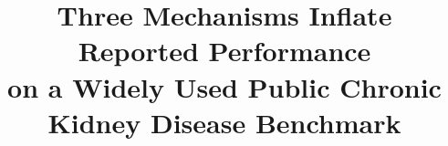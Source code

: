 \documentclass[conference]{IEEEtran}
\begin{document}
\title{Three Mechanisms Inflate Reported Performance\\
on a Widely Used Public Chronic Kidney Disease Benchmark}

\author{
}

\maketitle
\end{document}
